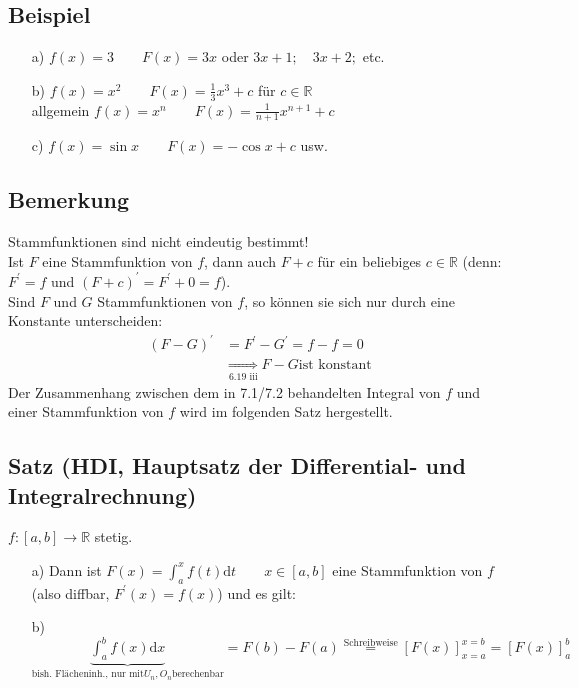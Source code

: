 \documentclass[12pt, titlepage]{article}
\newcommand{\R}{\mathds{R}}
\renewcommand{\>}{\rightarrow}
\renewcommand{\*}{\cdot}
\begin{document}
	\subsection{Beispiel}
	\begin{itemize}
		\item[a)] $f(x)=3\qquad F(x)=3x$ oder $3x+1;\quad3x+2;$ etc.
		\item[b)] $f(x)=x^2\qquad F(x)=\frac{1}{3}x^3+c$ für $c\in\R$\\
		allgemein $f(x)=x^n\qquad F(x)=\frac{1}{n+1}x^{n+1}+c$
		\item[c)] $f(x)=\sin x\qquad F(x)=-\cos x+c$ usw.
	\end{itemize}
	\subsection{Bemerkung}
	Stammfunktionen sind nicht eindeutig bestimmt!\\
	Ist $F$ eine Stammfunktion von $f$, dann auch $F+c$ für ein beliebiges $c\in\R$ (denn: $F^\prime=f$ und $(F+c)^\prime=F^\prime+0=f$).\\
	Sind $F$ und $G$ Stammfunktionen von $f$, so können sie sich nur durch eine Konstante unterscheiden:
	\begin{align*}
		(F-G)^\prime&=F^\prime-G^\prime=f-f=0\\
		&\underset{\textrm{6.19 iii}}{\Rightarrow} F-G\textrm{ist konstant}
	\end{align*}
	Der Zusammenhang zwischen dem in 7.1/7.2 behandelten Integral von $f$ und einer Stammfunktion von $f$ wird im folgenden Satz hergestellt.
	\subsection{Satz (HDI, Hauptsatz der Differential- und Integralrechnung)}
	$f\colon[a,b]\>\R$ stetig.
	\begin{itemize}
		\item[a)] Dann ist $F(x)=\int_{a}^{x}f(t)\textrm{d}t\qquad x\in[a,b]$ eine Stammfunktion von $f$ (also diffbar, $F^\prime(x)=f(x)$) und es gilt:
		\item[b)] $\underbrace{\int_{a}^{b}f(x)\textrm{d}x}_{\textrm{bish. Flächeninh., nur mit} U_n, O_n \textrm{berechenbar}}=F(b)-F(a)\overset{\textrm{Schreibweise}}{=}[F(x)]^{x=b}_{x=a}=[F(x)]^b_a$
	\end{itemize}
\end{document}
